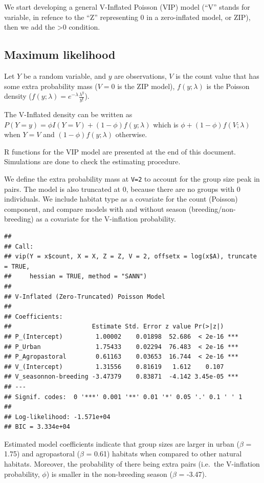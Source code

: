 \documentclass[]{article}
\begin{document}
We start developing a general V-Inflated Poisson (VIP) model (``V''
stands for variable, in refence to the ``Z'' representing 0 in a
zero-inflated model, or ZIP), then we add the \textgreater{}0 condition.

\subsection{Maximum likelihood}\label{maximum-likelihood}

Let \(Y\) be a random variable, and \(y\) are observations, \(V\) is the
count value that has some extra probability mass (\(V=0\) is the ZIP
model), \(f(y; \lambda)\) is the Poisson density
(\(f(y; \lambda) = e^{-\lambda} \frac{\lambda^{y}}{y!}\)).

The V-Inflated density can be written as
\(P(Y=y) = \phi I(Y=V) + (1-\phi) f(y; \lambda)\) which is
\(\phi + (1-\phi) f(V; \lambda)\) when \(Y=V\) and
\((1-\phi) f(y; \lambda)\) otherwise.

R functions for the VIP model are presented at the end of this document.
Simulations are done to check the estimating procedure.

We define the extra probability mass at \texttt{V=2} to account for the
group size peak in pairs. The model is also truncated at 0, because
there are no groups with 0 individuals. We include habitat type as a
covariate for the count (Poisson) component, and compare models with and
without season (breeding/non-breeding) as a covariate for the
V-inflation probability.

\begin{verbatim}
## 
## Call:
## vip(Y = x$count, X = X, Z = Z, V = 2, offsetx = log(x$A), truncate = TRUE, 
##     hessian = TRUE, method = "SANN")
## 
## V-Inflated (Zero-Truncated) Poisson Model
## 
## Coefficients:
##                      Estimate Std. Error z value Pr(>|z|)    
## P_(Intercept)         1.00002    0.01898  52.686  < 2e-16 ***
## P_Urban               1.75433    0.02294  76.483  < 2e-16 ***
## P_Agropastoral        0.61163    0.03653  16.744  < 2e-16 ***
## V_(Intercept)         1.31556    0.81619   1.612    0.107    
## V_seasonnon-breeding -3.47379    0.83871  -4.142 3.45e-05 ***
## ---
## Signif. codes:  0 '***' 0.001 '**' 0.01 '*' 0.05 '.' 0.1 ' ' 1 
## 
## Log-likelihood: -1.571e+04 
## BIC = 3.334e+04
\end{verbatim}

Estimated model coefficients indicate that group sizes are larger in
urban (\(\beta\) = 1.75) and agropastoral (\(\beta\) = 0.61) habitats
when compared to other natural habitats. Moreover, the probability of
there being extra pairs (i.e.~the V-inflation probability, \(\phi\)) is
smaller in the non-breeding season (\(\beta\) = -3.47).
\end{document}
